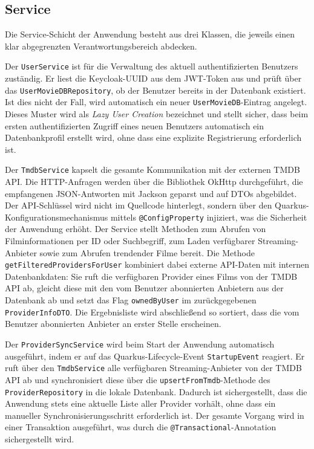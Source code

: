\subsection{Service}

Die Service-Schicht der Anwendung besteht aus drei Klassen, die jeweils
einen klar abgegrenzten Verantwortungsbereich abdecken.

Der \texttt{UserService} ist für die Verwaltung des aktuell authentifizierten
Benutzers zuständig. Er liest die Keycloak-UUID aus dem JWT-Token aus und
prüft über das \texttt{UserMovieDBRepository}, ob der Benutzer bereits in
der Datenbank existiert. Ist dies nicht der Fall, wird automatisch ein neuer
\texttt{UserMovieDB}-Eintrag angelegt. Dieses Muster wird als
\textit{Lazy User Creation} bezeichnet und stellt sicher, dass beim ersten
authentifizierten Zugriff eines neuen Benutzers automatisch ein
Datenbankprofil erstellt wird, ohne dass eine explizite Registrierung
erforderlich ist.

Der \texttt{TmdbService} kapselt die gesamte Kommunikation mit der externen
TMDB API. Die HTTP-Anfragen werden über die Bibliothek OkHttp durchgeführt,
die empfangenen JSON-Antworten mit Jackson geparst und auf DTOs abgebildet.
Der API-Schlüssel wird nicht im Quellcode hinterlegt, sondern über den
Quarkus-Konfigurationsmechanismus mittels \texttt{@ConfigProperty} injiziert,
was die Sicherheit der Anwendung erhöht. Der Service stellt Methoden zum
Abrufen von Filminformationen per ID oder Suchbegriff, zum Laden verfügbarer
Streaming-Anbieter sowie zum Abrufen trendender Filme bereit. Die Methode
\texttt{getFilteredProvidersForUser} kombiniert dabei externe API-Daten mit
internen Datenbankdaten: Sie ruft die verfügbaren Provider eines Films von
der TMDB API ab, gleicht diese mit den vom Benutzer abonnierten Anbietern
aus der Datenbank ab und setzt das Flag \texttt{ownedByUser} im
zurückgegebenen \texttt{ProviderInfoDTO}. Die Ergebnisliste wird abschließend
so sortiert, dass die vom Benutzer abonnierten Anbieter an erster Stelle
erscheinen.

Der \texttt{ProviderSyncService} wird beim Start der Anwendung automatisch
ausgeführt, indem er auf das Quarkus-Lifecycle-Event \texttt{StartupEvent}
reagiert. Er ruft über den \texttt{TmdbService} alle verfügbaren
Streaming-Anbieter von der TMDB API ab und synchronisiert diese über die
\texttt{upsertFromTmdb}-Methode des \texttt{ProviderRepository} in die
lokale Datenbank. Dadurch ist sichergestellt, dass die Anwendung stets eine
aktuelle Liste aller Provider vorhält, ohne dass ein manueller
Synchronisierungsschritt erforderlich ist. Der gesamte Vorgang wird in einer
Transaktion ausgeführt, was durch die \texttt{@Transactional}-Annotation
sichergestellt wird.

